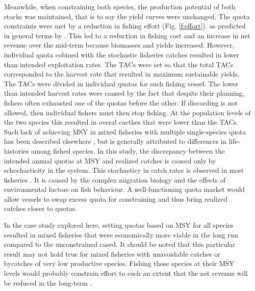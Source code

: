 \documentclass[12pt,oneline,a4paper,numbib]{ouparticle}
\numberwithin{equation}{subsection} %
\begin{document}
Meanwhile, when constraining both species, the production potential of both stocks was maintained, that is to say the yield curves were unchanged. The quota constraints were met by a reduction in fishing effort (Fig. \ref{f:effort}). as predicted in general terms by \cite{Ulrich2017}. This led to a reduction in fishing cost and an increase in net revenue over the mid-term because biomasses and yields increased. However, individual quota cobined with the stochastic fisheries catches resulted in lower than intended exploitation rates. The TACs were set so that the total TACs corresponded to the harvest rate that resulted in maximum sustainable yields. The TACs were divided in individual quotas for each fishing vessel. The lower than intended harvest rates were caused by the fact that despite their planning, fishers often exhausted one of the quotas before the other. If discarding is not allowed, then individual fishers must then stop fishing. At the population levels of the two species this resulted in overal cacthes that were lower than the TACs. Such lack of achieving MSY in mixed fisheries with multiple single-species quota has been described elsewhere \cite{Kempf2016, Rindorf2017, Hilborn2015}, but is generally attributed to differences in life-histories among fished species. In this study, the discrepancy between the intended annual quotas at MSY and realized catches is caused only by schochasticity in the system. This stochasticy in catch rates is observed in most fisheries \cite{Sampson1988, VanOostenbrugge2004, Smith1980, Bernasconi2015}. It is caused by the complex migration biology and the effects of environmental factors on fish behaviour. A well-functioning quota market would allow vessels to swap excess quota for constraining and thus bring realized catches closer to quotas. 

In the case study explored here, setting quotas based on MSY for all species resulted in mixed fisheries that were economically more viable in the long run compared to the unconstrained cased. It should be noted that this particular result may not hold true for mixed fisheries with unavoidable catches or bycatches of very low productive species. Fishing those species at their MSY levels would probably constrain effort to such an extent that the net revenue will be reduced in the long-term \cite{Prellezo2016a,  Rindorf2017}.
\end{document}
